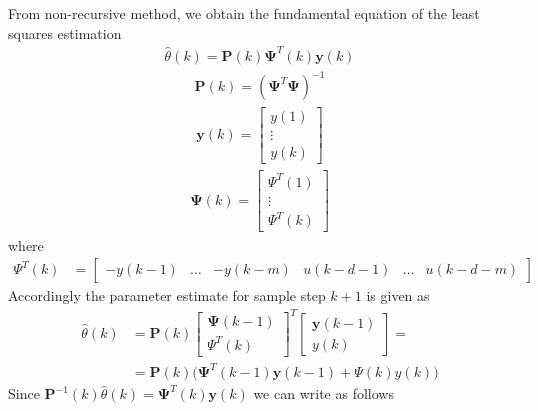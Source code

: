 \documentclass[12pt,a4paper,oneside]{book}
\begin{document}
\begin{onehalfspace}
From non-recursive method, we obtain the fundamental equation of the least 
squares estimation
\begin{equation}\label{eq:17}
	\begin{aligned}
		\hat{\theta}(k)=\mathbf{P}(k)\mathbf{\Psi}^T(k)\mathbf{y}(k)
	\end{aligned}
\end{equation}
\begin{equation}
	\begin{aligned}
		\mathbf{P}(k)=\left(\mathbf{\Psi}^T\mathbf{\Psi}\right)^{-1}
	\end{aligned}
\end{equation}
\begin{equation}
	\begin{aligned}
		\mathbf{y}(k)=
		\begin{bmatrix}
			y(1)\\
			\vdots\\
			y(k)
		\end{bmatrix}
	\end{aligned}
\end{equation}
\begin{equation}
	\begin{aligned}
		\mathbf{\Psi}(k)=
		\begin{bmatrix}
			\Psi^T(1)\\
			\vdots\\
			\Psi^T(k)
		\end{bmatrix}
	\end{aligned}
\end{equation}
where
\begin{equation}
	\begin{aligned}
		\Psi^T(k)&=
		\begin{bmatrix}
			-y(k-1) & \dots & -y(k-m) & u(k-d-1) & \dots & u(k-d-m)
		\end{bmatrix}
	\end{aligned}
\end{equation}
Accordingly the parameter estimate for sample step $k+1$ is given as
\begin{equation}
	\begin{aligned}
		\hat{\theta}(k) &= \mathbf{P}(k)
		\begin{bmatrix}
			\mathbf{\Psi}(k-1)\\[6pt]
			\Psi^T(k)
		\end{bmatrix}^T
		\begin{bmatrix}
			\mathbf{y}(k-1)\\[6pt]
			y(k)
		\end{bmatrix}= \\[6pt]
		&= 
		\mathbf{P}(k)\Big(\mathbf{\Psi}^T(k-1)\mathbf{y}(k-1)+\Psi(k)y(k)\Big) 
	\end{aligned}
\end{equation}
Since $\mathbf{P}^{-1}(k)\hat{\theta}(k)=\mathbf{\Psi}^T(k)\mathbf{y}(k)$ we 
can write as follows


\end{onehalfspace}
\end{document}
